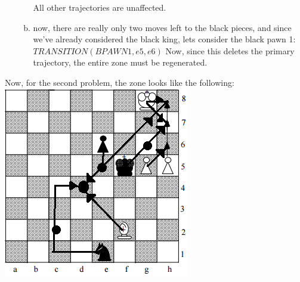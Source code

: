 \documentclass[11pt]{article}
\begin{document}
\begin{enumerate}
\begin{enumerate}[(a)]
All other trajectories are unaffected. \\
\item now, there are really only two moves left to the black pieces, and since we've already considered the black king, lets consider the black pawn 1: $TRANSITION(BPAWN1, e5, e6)$
Now, since this deletes the primary trajectory, the entire zone must be regenerated. 
\end{enumerate}
\end{enumerate}

Now, for the second problem, the zone looks like the following: \\
\includegraphics{P2Zone.png}\\\\
\end{document}
